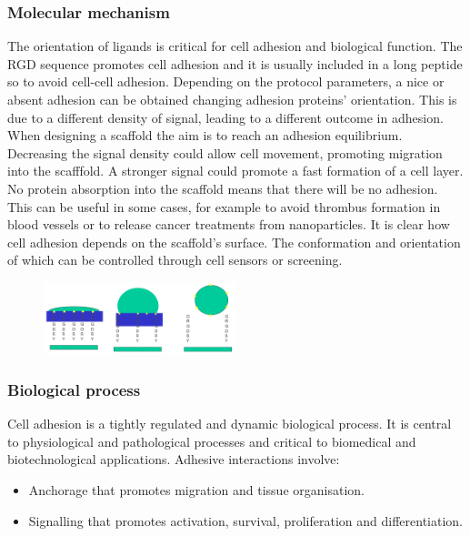 		\subsubsection{Molecular mechanism}
		The orientation of ligands is critical for cell adhesion and biological function.
		The RGD sequence promotes cell adhesion and it is usually included in a long peptide so to avoid cell-cell adhesion.
		Depending on the protocol parameters, a nice or absent adhesion can be obtained changing adhesion proteins' orientation.
		This is due to a different density of signal, leading to a different outcome in adhesion.
		When designing a scaffold the aim is to reach an adhesion equilibrium.
		Decreasing the signal density could allow cell movement, promoting migration into the scafffold.
		A stronger signal could promote a fast formation of a cell layer.
		No protein absorption into the scaffold means that there will be no adhesion.
		This can be useful in some cases, for example to avoid thrombus formation in blood vessels or to release cancer treatments from nanoparticles.
		It is clear how cell adhesion depends on the scaffold's surface.
		The conformation and orientation of which can be controlled through cell sensors or screening.

		\begin{figure}[h]
		\centering
		\includegraphics[width=0.5\textwidth]{adhesion}
		\caption{\label{fig:adhesion}}
		\end{figure}

		\subsubsection{Biological process}
		Cell adhesion is a tightly regulated and dynamic biological process.
		It is central to physiological and pathological processes and critical to biomedical and biotechnological applications.
		Adhesive interactions involve:

		\begin{multicols}{2}
			\begin{itemize}
				\item Anchorage that promotes migration and tissue organisation.
				\item Signalling that promotes activation, survival, proliferation and differentiation.
			\end{itemize}
		\end{multicols}

